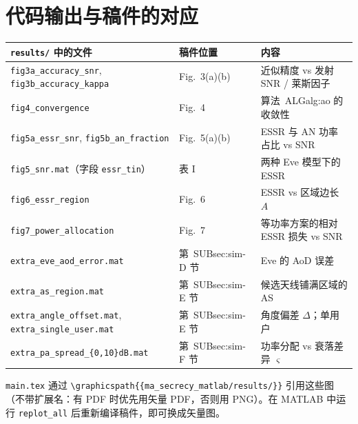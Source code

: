 \documentclass[11pt,a4paper]{ctexart}
\newcommand{\code}[1]{\texttt{#1}}
\begin{document}
\section{代码输出与稿件的对应}
\begin{center}\small
\begin{tabular}{lll}
\toprule
\code{results/} 中的文件 & 稿件位置 & 内容 \\ \midrule
\code{fig3a\_accuracy\_snr}, \code{fig3b\_accuracy\_kappa} & Fig.~3(a)(b) & 近似精度 vs 发射 SNR / 莱斯因子 \\
\code{fig4\_convergence} & Fig.~4 & 算法~ALG{alg:ao} 的收敛性 \\
\code{fig5a\_essr\_snr}, \code{fig5b\_an\_fraction} & Fig.~5(a)(b) & ESSR 与 AN 功率占比 vs SNR \\
\code{fig5\_snr.mat}（字段 \code{essr\_tin}） & 表 I & 两种 Eve 模型下的 ESSR \\
\code{fig6\_essr\_region} & Fig.~6 & ESSR vs 区域边长 $A$ \\
\code{fig7\_power\_allocation} & Fig.~7 & 等功率方案的相对 ESSR 损失 vs SNR \\
\code{extra\_eve\_aod\_error.mat} & 第~SUB{sec:sim}-D 节 & Eve 的 AoD 误差 \\
\code{extra\_as\_region.mat} & 第~SUB{sec:sim}-E 节 & 候选天线铺满区域的 AS \\
\code{extra\_angle\_offset.mat}, \code{extra\_single\_user.mat} & 第~SUB{sec:sim}-E 节 & 角度偏差 $\Delta$；单用户 \\
\code{extra\_pa\_spread\_\{0,10\}dB.mat} & 第~SUB{sec:sim}-F 节 & 功率分配 vs 衰落差异 $\varsigma$ \\
\bottomrule
\end{tabular}
\end{center}
\code{main.tex} 通过 \code{\textbackslash graphicspath\{\{ma\_secrecy\_matlab/results/\}\}} 引用这些图（不带扩展名：有 PDF 时优先用矢量 PDF，否则用 PNG）。在 MATLAB 中运行 \code{replot\_all} 后重新编译稿件，即可换成矢量图。

\end{document}
